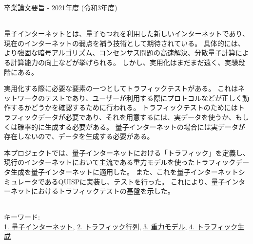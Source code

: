 卒業論文要旨 - 2021年度 (令和3年度)
\begin{center}
\begin{large}
\end{large}
\end{center}

~ \\

量子インターネットとは、量子もつれを利用した新しいインターネットであり、現在のインターネットの弱点を補う技術として期待されている。
具体的には、より強固な暗号アルゴリズム、コンセンサス問題の高速解決、分散量子計算による計算能力の向上などが挙げられる。
しかし、実用化はまだまだ遠く、実験段階にある。

実用化する際に必要な要素の一つとしてトラフィックテストがある。
これはネットワークのテストであり、ユーザーが利用する際にプロトコルなどが正しく動作するかどうかを確認するために行われる。
トラフィックテストのためにはトラフィックデータが必要であり、それを用意するには、実データを使うか、もしくは確率的に生成する必要がある。
量子インターネットの場合には実データが存在しないので、データを生成する必要がある。

本プロジェクトでは、量子インターネットにおける「トラフィック」を定義し、現行のインターネットにおいて主流である重力モデルを使ったトラフィックデータ生成を量子インターネットに適用した。
また、これを量子インターネットシミュレータであるQUISPに実装し、テストを行った。
これにより、量子インターネットにおけるトラフィックテストの基盤を示した。

~ \\
キーワード:\\
\underline{1. 量子インターネット},
\underline{2. トラフィック行列},
\underline{3. 重力モデル},
\underline{4. トラフィック生成}
\begin{flushright}
\dept \\
\author
\end{flushright}
